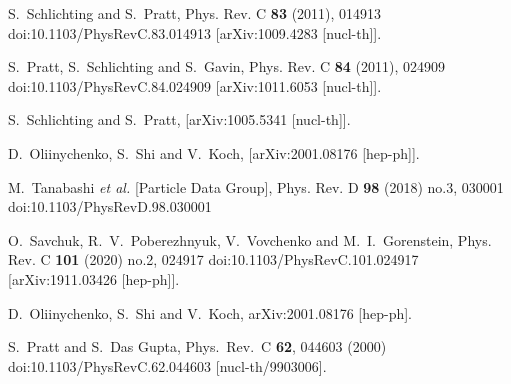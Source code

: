 \documentclass[aps,prc,nofootinbib,showpacs,superscriptaddress,groupedaddress]{revtex4-1}
\begin{document}
\begin{thebibliography}{99}

S.~Schlichting and S.~Pratt,
Phys. Rev. C \textbf{83} (2011), 014913
doi:10.1103/PhysRevC.83.014913
[arXiv:1009.4283 [nucl-th]].

S.~Pratt, S.~Schlichting and S.~Gavin,
Phys. Rev. C \textbf{84} (2011), 024909
doi:10.1103/PhysRevC.84.024909
[arXiv:1011.6053 [nucl-th]].

S.~Schlichting and S.~Pratt,
[arXiv:1005.5341 [nucl-th]].

D.~Oliinychenko, S.~Shi and V.~Koch,
[arXiv:2001.08176 [hep-ph]].

M.~Tanabashi \textit{et al.} [Particle Data Group],
Phys. Rev. D \textbf{98} (2018) no.3, 030001
doi:10.1103/PhysRevD.98.030001

O.~Savchuk, R.~V.~Poberezhnyuk, V.~Vovchenko and M.~I.~Gorenstein,
Phys. Rev. C \textbf{101} (2020) no.2, 024917
doi:10.1103/PhysRevC.101.024917
[arXiv:1911.03426 [hep-ph]].

  D.~Oliinychenko, S.~Shi and V.~Koch,
  arXiv:2001.08176 [hep-ph].
  
  S.~Pratt and S.~Das Gupta,
  Phys.\ Rev.\ C {\bf 62}, 044603 (2000)
  doi:10.1103/PhysRevC.62.044603
  [nucl-th/9903006].


\end{thebibliography}
\end{document}
